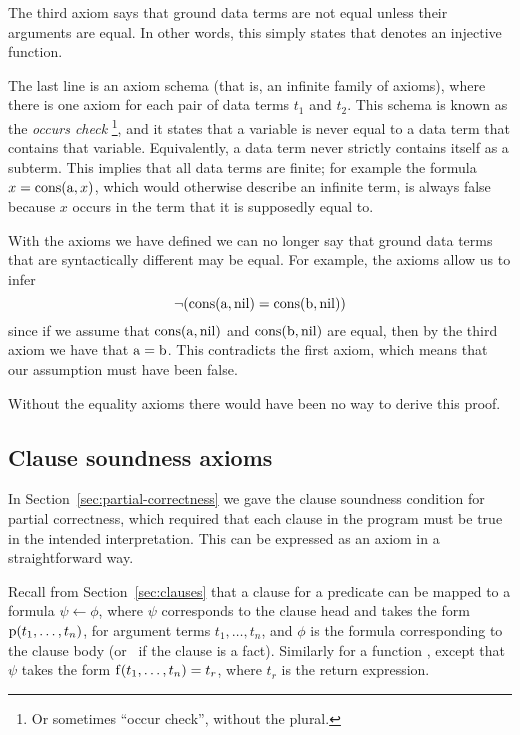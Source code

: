 The third axiom says that
ground data terms are not equal
unless their arguments are equal.
In other words,
this simply states that
 denotes an injective function.

The last line is an axiom schema
(that is, an infinite family of axioms),
where there is one axiom for each pair of data terms $t_1$ and $t_2$.
This schema is known as the \emph{occurs check\label{gi:occurs-check}}%
\footnote{
Or sometimes ``occur check'', without the plural.
},
and it states that a variable is never equal to
a data term that contains that variable.
Equivalently,
a data term never strictly contains itself as a subterm.
This implies that all data terms are finite;
for example the formula $x = \operatorname{cons}(\operatorname{a}, x)$,
which would otherwise describe an infinite term,
is always false because $x$ occurs in the term
that it is supposedly equal to.

With the axioms we have defined
we can no longer say that
ground data terms that are syntactically different may be equal.
For example, the axioms allow us to infer
\[
    \lnot (\operatorname{cons}(\operatorname{a}, \operatorname{nil}) = \operatorname{cons}(\operatorname{b}, \operatorname{nil}))
\]
since if we assume that
$\operatorname{cons}(\operatorname{a}, \operatorname{nil})$
and
$\operatorname{cons}(\operatorname{b}, \operatorname{nil})$
are equal,
then by the third axiom we have that $\operatorname{a} = \operatorname{b}$.
This contradicts the first axiom,
which means that our assumption must have been false.

Without the equality axioms there would have been
no way to derive this proof.


\subsection{Clause soundness axioms}
\label{sec:ax-clause-soundness}

In Section~\ref{sec:partial-correctness}
we gave the clause soundness condition
for partial correctness,
which required that each clause in the program
must be true in the intended interpretation.
This can be expressed as an axiom
in a straightforward way.

Recall from Section~\ref{sec:clauses}
that a clause for a predicate 
can be mapped to a formula $\psi \leftarrow \phi$,
where $\psi$ corresponds to the clause head
and takes the form $\operatorname{p}(t_1, \ldots, t_n)$,
for argument terms $t_1, \ldots, t_n$,
and $\phi$ is the formula corresponding to the clause body
(or \true\ if the clause is a fact).
Similarly for a function ,
except that $\psi$ takes the form $\operatorname{f}(t_1, \ldots, t_n) = t_r$,
where $t_r$ is the return expression.

